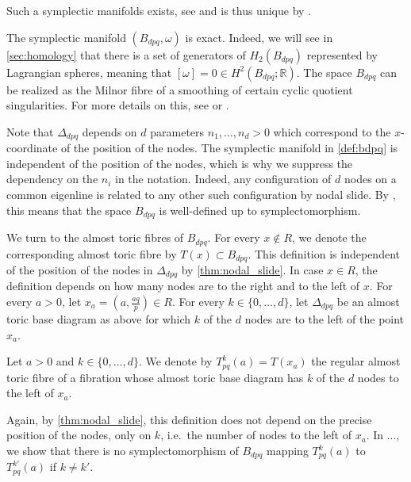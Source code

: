 \documentclass[12pt,a4paper,draft]{scrartcl}
\begin{document}
Such a symplectic manifolds exists, see \cite[Section 7.4]{evans2021atfs} and is thus unique by \cite[Theorem 8.5]{evans2021atfs}. 

\begin{remark}
    The symplectic manifold $(B_{dpq}, \omega)$ is exact. Indeed, we will see in \cref{sec:homology} that there is a set of generators of $H_2(B_{dpq})$ represented by Lagrangian spheres, meaning that $[\omega] = 0 \in H^2(B_{dpq};\mathbb{R})$. The space $B_{dpq}$ can be realized as the Milnor fibre of a smoothing of certain cyclic quotient singularities. For more details on this, see \cite[Section 7.4]{evans2021atfs} or \cite{Eva19}.
\end{remark}

Note that $\Delta_{dpq}$ depends on $d$ parameters $n_1,\ldots,n_d > 0$ which correspond to the $x$-coordinate of the position of the nodes. The symplectic manifold in \cref{def:bdpq} is independent of the position of the nodes, which is why we suppress the dependency on the $n_i$ in the notation. Indeed, any configuration of $d$ nodes on a common eigenline is related to any other such configuration by nodal slide. By \cite[Theorem 8.10]{evans2021atfs}, this means that the space $B_{dpq}$ is well-defined up to symplectomorphism.

We turn to the almost toric fibres of $B_{dpq}$. For every $x \notin R$, we denote the corresponding almost toric fibre by $T(x) \subset B_{dpq}$. This definition is independent of the position of the nodes in $\Delta_{dpq}$ by \cref{thm:nodal_slide}. In case $x \in R$, the definition depends on how many nodes are to the right and to the left of $x$. For every $a > 0$, let $x_a = \left( a,\frac{aq}{p} \right) \in R$. For every $k \in \{0,\ldots,d\}$, let $\Delta_{dpq}$ be an almost toric base diagram as above for which $k$ of the $d$ nodes are to the left of the point $x_a$. 

\begin{definition}
    Let $a>0$ and $k \in \{0,\ldots,d\}$. We denote by $T^k_{pq}(a) = T(x_a)$ the regular almost toric fibre of a fibration whose almost toric base diagram has $k$ of the $d$ nodes to the left of $x_a$. 
\end{definition}

Again, by \cref{thm:nodal_slide}, this definition does not depend on the precise position of the nodes, only on $k$, i.e.\ the number of nodes to the left of $x_a$. In ..., we show that there is no symplectomorphism of $B_{dpq}$ mapping $T^k_{pq}(a)$ to $T^{k'}_{pq}(a)$ if $k \neq k'$.
\end{document}
